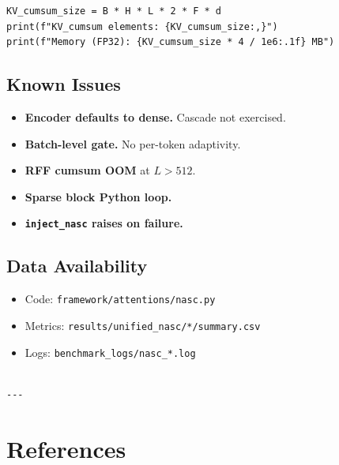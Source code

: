 \begin{lstlisting}
KV_cumsum_size = B * H * L * 2 * F * d
print(f"KV_cumsum elements: {KV_cumsum_size:,}")
print(f"Memory (FP32): {KV_cumsum_size * 4 / 1e6:.1f} MB")
\end{lstlisting}

\subsection{Known Issues}

\begin{itemize}
\item \textbf{Encoder defaults to dense.} Cascade not exercised.
\item \textbf{Batch-level gate.} No per-token adaptivity.
\item \textbf{RFF cumsum OOM} at $L > 512$.
\item \textbf{Sparse block Python loop.}
\item \textbf{\texttt{inject\_nasc} raises on failure.}

\end{itemize}
\subsection{Data Availability}

\begin{itemize}
\item Code: \texttt{framework/attentions/nasc.py}
\item Metrics: \texttt{results/unified\_nasc/*/summary.csv}
\item Logs: \texttt{benchmark\_logs/nasc\_*.log}
\end{itemize}
\begin{lstlisting}

---
\end{lstlisting}


\section{References}

